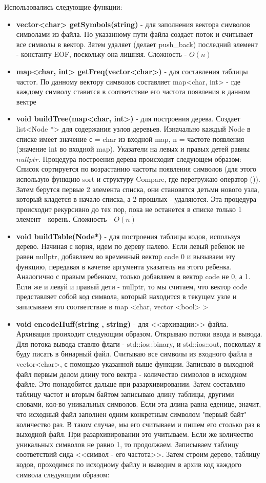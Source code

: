 \documentclass[russian, a4paper, 12pt]{article}
\begin{document}
Использовались следующие функции:
\begin{itemize}
  \item \textbf{vector<char> getSymbols(string)} - для заполнения вектора
  символов символами из файла.
  По указанному пути файла создает поток и считывает все символы в вектор.
  Затем удаляет (делает push\_back) последний элемент - константу EOF,
  поскольку она лишняя. Сложность - $O(n)$
  \item \textbf{map<char, int> getFreq(vector<char>)} - для составления таблицы частот.
  По данному вектору символов составляет map<char, int> - где каждому символу ставится
  в соответствие его частота появления в данном вектре
  \item \textbf{void buildTree(map<char, int>)} - для построения дерева.
  Создает list<Node *> для содержания узлов деревьев. Изначально каждый Node
  в списке имеет значение с = char из входной map, n = частоте появления (значение int во входной map).
  Указатели на левых и правых детей равны $nullptr$. Процедура построения дерева происходит следующем образом:
  Список сортируется по возрастанию частоты появления символов (для этого использую
  функцию sort и структуру Compare, где перегружаю оператор ()).
  Затем берутся первые 2 элемента списка, они становятся детьми нового узла,
  который кладется в начало списка, а 2 прошлых - удаляются. Эта процедура происходит
  рекурсивно до тех пор, пока не останется в списке только 1 элемент - корень. Сложность - $O(n)$
  \item \textbf{void buildTable(Node*)} - для построения таблицы кодов, используя
  дерево. Начиная с корня, идем по дереву налево. Если
  левый ребенок не равен nullptr, добавляем во временный вектор code 0 и
  вызываем эту функцию, передавая в качетве аргумента указатель на этого ребенка.
  Аналогично с правым ребенком, только добавляем в вектор code не 0, а 1. Если же
  и левуй и правый дети - nullptr, то мы считаем, что вектор code представляет собой
  код символа, который находится в текущем узле и записываем это соответствие в map <char, vector <bool> >
  \item \textbf{void encodeHuff(string , string)} - для <<архивации>> файла.
  Архивация проиходит следующим образом. Открываю потоки ввода
  и вывода. Для потока вывода ставлю флаги - std::ios::binary, и std::ios::out,
  поскольку я буду писать в бинарный файл. Считываю все символы из входного файла
  в vector<char>, с помощью указанной выше функции. Записваю в выходной файл первым делом
  длину того вектра - количество символов в исходном файле. Это понадобится
  дальше при разархивировании. Затем составляю таблицу
  частот и вторым байтом записываю длину таблицы, другими словами, кол-во
  уникальных символов. Если эта длина равна еденице, значит,
  что исходный файл заполнен одним конкретным символом "первый байт" количество
  раз. В таком случае, мы его считываем и пишем его столько раз в выходной файл.
  При разархивировании это учитываем. Если же количество
  уникальных символов не равно 1, то продолжаем. Записываем таблицу соответствий
  сида <<символ - его частота>>. Затем строим дерево, таблицу кодов,
  проходимся по исходному файлу и выводим в архив
  код каждого символа следующим образом:


\end{itemize}
\end{document}
